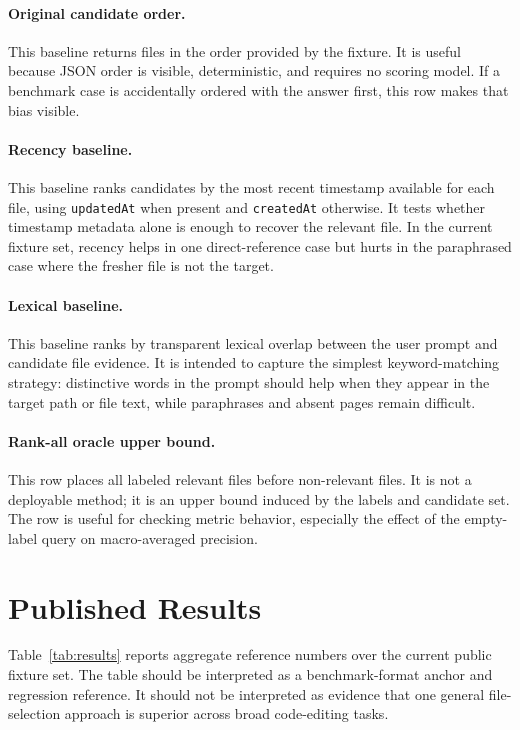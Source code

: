 \documentclass[11pt,a4paper]{article}
\begin{document}
\paragraph{Original candidate order.}
This baseline returns files in the order provided by the fixture. It is useful
because JSON order is visible, deterministic, and requires no scoring model.
If a benchmark case is accidentally ordered with the answer first, this row
makes that bias visible.

\paragraph{Recency baseline.}
This baseline ranks candidates by the most recent timestamp available for each
file, using \texttt{updatedAt} when present and \texttt{createdAt} otherwise.
It tests whether timestamp metadata alone is enough to recover the relevant
file. In the current fixture set, recency helps in one direct-reference case but
hurts in the paraphrased case where the fresher file is not the target.

\paragraph{Lexical baseline.}
This baseline ranks by transparent lexical overlap between the user prompt and
candidate file evidence. It is intended to capture the simplest keyword-matching
strategy: distinctive words in the prompt should help when they appear in the
target path or file text, while paraphrases and absent pages remain difficult.

\paragraph{Rank-all oracle upper bound.}
This row places all labeled relevant files before non-relevant files. It is not
a deployable method; it is an upper bound induced by the labels and candidate
set. The row is useful for checking metric behavior, especially the effect of
the empty-label query on macro-averaged precision.

\section{Published Results}
\label{sec:results}

Table~\ref{tab:results} reports aggregate reference numbers over the current
public fixture set. The table should be interpreted as a benchmark-format anchor
and regression reference. It should not be interpreted as evidence that one
general file-selection approach is superior across broad code-editing tasks.
\end{document}
